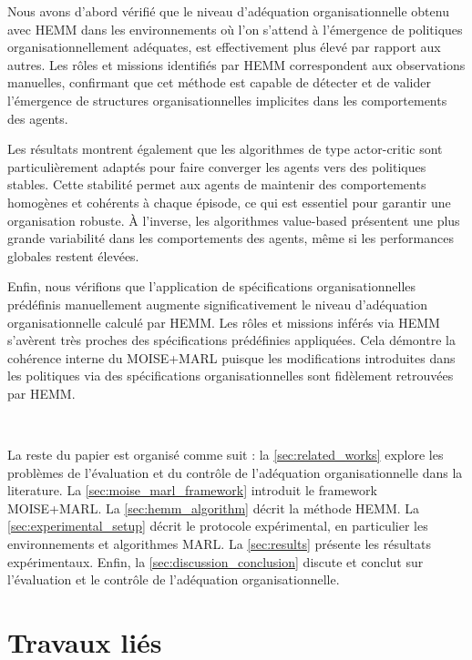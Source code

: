 \documentclass[sigconf,anonymous]{aamas}
\begin{document}
Nous avons d'abord vérifié que le niveau d'adéquation organisationnelle obtenu avec HEMM dans les environnements où l'on s'attend à l'émergence de politiques organisationnellement adéquates, est effectivement plus élevé par rapport aux autres. Les rôles et missions identifiés par HEMM correspondent aux observations manuelles, confirmant que cet méthode est capable de détecter et de valider l'émergence de structures organisationnelles implicites dans les comportements des agents.

Les résultats montrent également que les algorithmes de type actor-critic
sont particulièrement adaptés pour faire converger les agents vers des politiques stables. Cette stabilité permet aux agents de maintenir des comportements homogènes et cohérents à chaque épisode, ce qui est essentiel pour garantir une organisation robuste. À l'inverse, les algorithmes value-based
présentent une plus grande variabilité dans les comportements des agents, même si les performances globales restent élevées.

Enfin, nous vérifions que l'application de spécifications organisationnelles prédéfinis manuellement augmente significativement le niveau d'adéquation organisationnelle calculé par HEMM. Les rôles et missions inférés via HEMM s'avèrent très proches des spécifications prédéfinies appliquées. Cela démontre la cohérence interne du MOISE+MARL puisque les modifications introduites dans les politiques via des spécifications organisationnelles sont fidèlement retrouvées par HEMM.

\

La reste du papier est organisé comme suit : la \autoref{sec:related_works} explore les problèmes de l'évaluation et du contrôle de l'adéquation organisationnelle dans la literature. La \autoref{sec:moise_marl_framework} introduit le framework MOISE+MARL. La \autoref{sec:hemm_algorithm} décrit la méthode HEMM. La \autoref{sec:experimental_setup} décrit le protocole expérimental, en particulier les environnements et algorithmes MARL. La \autoref{sec:results} présente les résultats expérimentaux. Enfin, la \autoref{sec:discussion_conclusion} discute et conclut sur l'évaluation et le contrôle de l'adéquation organisationnelle.

\section{Travaux liés}
\label{sec:related_works}
\end{document}
